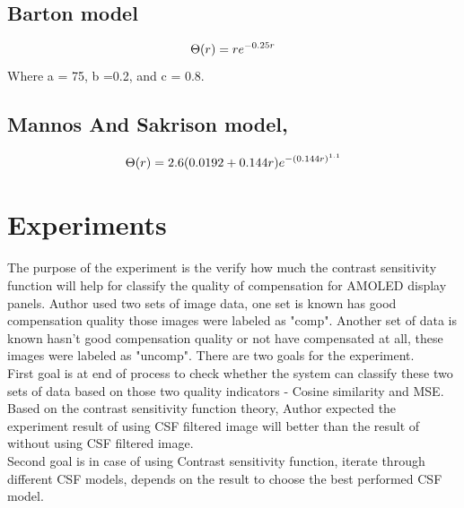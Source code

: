 \documentclass{article}
\begin{document}
\subsection{Barton model}
\begin{equation}
    \centering
    \label{eq:mannos}
     \Theta(r) = re^{-0.25r}
\end{equation}
Where a = 75, b =0.2, and c = 0.8.
\subsection{Mannos And Sakrison model,\cite{Mannos-Sakrison}}
\begin{equation}
    \centering
    \label{eq:mannos}
     \Theta(r) = 2.6(0.0192+0.144r)e^{-(0.144r)^{1.1}}
\end{equation}

\section{Experiments}
The purpose of the experiment is the verify how much the contrast sensitivity function will help for classify the quality of compensation for AMOLED display panels. Author used two sets of image data, one set is known has good compensation quality those images were labeled as "comp". Another set of data is known hasn't good compensation quality or not have compensated at all, these images were labeled as "uncomp". There are two goals for the experiment.\\
First goal is at end of process to check whether the system can classify these two sets of data based on those two quality indicators - Cosine similarity and MSE. Based on the contrast sensitivity function theory, Author expected the experiment result of using CSF filtered image will better than the result of without using CSF filtered image.\\
Second goal is in case of using Contrast sensitivity function, iterate through different CSF models, depends on the result to choose the best performed CSF model.
\end{document}
